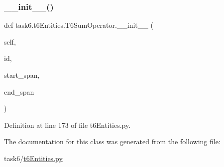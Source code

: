 \subsubsection{\texorpdfstring{\+\_\+\+\_\+init\+\_\+\+\_\+()}{\_\_init\_\_()}}
{\footnotesize\ttfamily def task6.\+t6\+Entities.\+T6\+Sum\+Operator.\+\_\+\+\_\+init\+\_\+\+\_\+ (\begin{DoxyParamCaption}\item[{}]{self,  }\item[{}]{id,  }\item[{}]{start\+\_\+span,  }\item[{}]{end\+\_\+span }\end{DoxyParamCaption})}



Definition at line 173 of file t6\+Entities.\+py.



The documentation for this class was generated from the following file\+:\begin{DoxyCompactItemize}
\item 
task6/\hyperlink{t6Entities_8py}{t6\+Entities.\+py}\end{DoxyCompactItemize}
